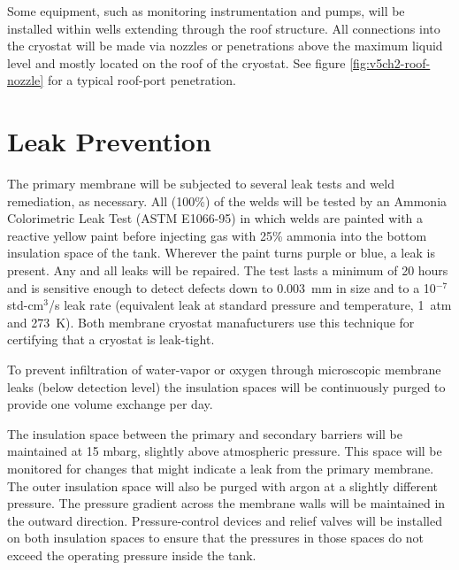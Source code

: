 Some equipment, such as monitoring instrumentation and pumps, 
will be installed within wells extending through the roof 
structure. All connections into the cryostat will be made 
via nozzles or penetrations above the maximum liquid level 
and mostly located on the roof of the cryostat. See figure 
\ref{fig:v5ch2-roof-nozzle} for a typical roof-port 
penetration.  

\chapter{Leak Prevention}
\label{sec:cryo-cryosys-leak}

The primary membrane will be subjected to several leak tests 
and weld remediation, as necessary. All (100\%) of the welds 
will be tested by an Ammonia Colorimetric Leak Test (ASTM E1066-95) 
in which welds are painted with a reactive yellow paint before 
injecting gas with 25\% ammonia into the bottom insulation space 
of the tank.  Wherever the paint turns purple or blue, a leak 
is present. Any and all leaks will be repaired. The test lasts 
a minimum of 20 hours and is sensitive enough to detect defects down 
to 0.003~mm in size and to a 10$^{-7}$ std-cm$^3$/s leak 
rate (equivalent leak at standard pressure and temperature, 
1~atm and 273~K). Both membrane cryostat manafucturers use 
this technique for certifying that a cryostat is leak-tight.


To prevent infiltration of water-vapor or oxygen through 
microscopic membrane leaks (below detection level) the 
insulation spaces will be continuously purged to provide 
one volume exchange per day.  

The insulation space between the primary and 
secondary barriers will be maintained at 15 mbarg,  
slightly above atmospheric pressure. This space will
be monitored for changes that might indicate a leak 
from the primary membrane.  The outer insulation space 
will also be purged with argon at a slightly different 
pressure. The pressure gradient across the membrane walls 
will be maintained in the outward direction. Pressure-control 
devices and relief valves will be installed on both insulation 
spaces to ensure that the pressures in those spaces do not 
exceed the operating pressure inside the tank. 

